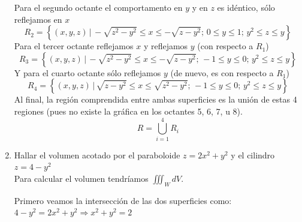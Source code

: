 \documentclass{article}
\begin{document}
\begin{enumerate}
{        Para el segundo octante el comportamento en $y$ y en $z$ es idéntico, sólo reflejamos en $x$
        \[
            R_2=\left\{
                    (x,y,z)\,\big\vert\,
                    -\sqrt{z^2-y^2}\leq x\leq-\sqrt{z-y^2};\,
                    0\leq y\leq 1;\,
                    y^2\leq z\leq y
                \right\}
        \]
        Para el tercer octante reflejamos $x$ y reflejamos $y$ (con respecto a $R_1$)
        \[
            R_3=\left\{
                    (x,y,z)\,\big\vert\,
                    -\sqrt{z^2-y^2}\leq x\leq-\sqrt{z-y^2};\,
                    -1\leq y\leq 0;\,
                    y^2\leq z\leq y
                \right\}
        \]
        Y para el cuarto octante sólo reflejamos $y$ (de nuevo, es con respecto a $R_1$)
        \[
            R_4=\left\{
                    (x,y,z)\,\big\vert\,
                    \sqrt{z-y^2}\leq x\leq\sqrt{z^2-y^2};\,
                    -1\leq y\leq 0;\,
                    y^2\leq z\leq y
                \right\}
        \]
        Al final, la región comprendida entre ambas superficies es la unión de estas 4 regiones
        (pues no existe la gráfica en los octantes 5, 6, 7, u 8).
        \[
            R=\bigcup_{i=1}^4{R_i}
        \]
    }

    \item {
        Hallar el volumen acotado por el paraboloide $z = 2x^2 + y^2$ y el cilindro $z = 4 - y^2$\\

        \color{azul}
        Para calcular el volumen tendríamos $\iiint_W dV$.

        Primero veamos la intersección de las dos superficies como: $4-y^2 = 2x^2 + y^2
        \Rightarrow x^2+y^2 = 2$

}
\end{enumerate}
\end{document}
